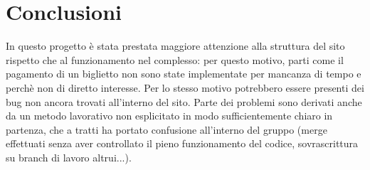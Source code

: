 \documentclass[a4paper, 12pt]{article}
\begin{document}
\section{Conclusioni}
In questo progetto è stata prestata maggiore attenzione alla struttura del sito rispetto che al funzionamento nel complesso: per questo motivo, parti come il pagamento di un biglietto non sono state implementate
per mancanza di tempo e perchè non di diretto interesse. Per lo stesso motivo potrebbero essere presenti dei bug non ancora trovati all'interno del sito. Parte dei problemi sono derivati anche da un metodo lavorativo
non esplicitato in modo sufficientemente chiaro in partenza, che a tratti ha portato confusione all'interno del gruppo (merge effettuati senza aver controllato il pieno funzionamento del codice, sovrascrittura
su branch di lavoro altrui...).
\end{document}
